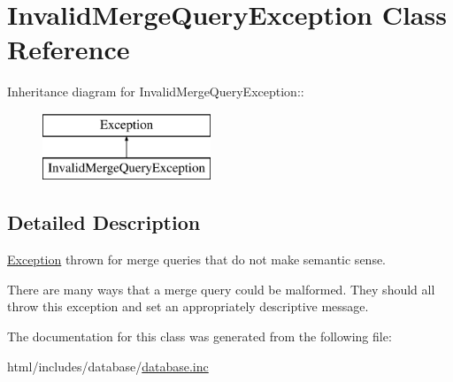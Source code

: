 \hypertarget{classInvalidMergeQueryException}{
\section{InvalidMergeQueryException Class Reference}
\label{classInvalidMergeQueryException}
}
Inheritance diagram for InvalidMergeQueryException::\begin{figure}[H]
\begin{center}
\leavevmode
\includegraphics[height=2cm]{classInvalidMergeQueryException}
\end{center}
\end{figure}


\subsection{Detailed Description}
\hyperlink{classException}{Exception} thrown for merge queries that do not make semantic sense.

There are many ways that a merge query could be malformed. They should all throw this exception and set an appropriately descriptive message. 

The documentation for this class was generated from the following file:\begin{DoxyCompactItemize}
\item 
html/includes/database/\hyperlink{database_8inc}{database.inc}\end{DoxyCompactItemize}
